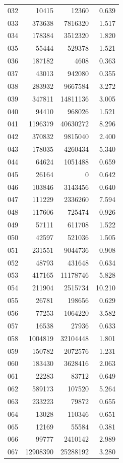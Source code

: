 \documentclass[anonymous,notoc]{gmcm2026}
\begin{document}
\begin{longtable}{lrrr}
032 & 10415 & 12360 & 0.639 \\
033 & 373638 & 7816320 & 1.517 \\
034 & 178384 & 3512320 & 1.820 \\
035 & 55444 & 529378 & 1.521 \\
036 & 187182 & 4608 & 0.363 \\
037 & 43013 & 942080 & 0.355 \\
038 & 283932 & 9667584 & 3.272 \\
039 & 347811 & 14811136 & 3.005 \\
040 & 94410 & 968026 & 1.521 \\
041 & 1196379 & 40630272 & 8.296 \\
042 & 370832 & 9815040 & 2.400 \\
043 & 178035 & 4260434 & 5.340 \\
044 & 64624 & 1051488 & 0.659 \\
045 & 26164 & 0 & 0.642 \\
046 & 103846 & 3143456 & 0.640 \\
047 & 111229 & 2336260 & 7.594 \\
048 & 117606 & 725474 & 0.926 \\
049 & 57111 & 611708 & 1.522 \\
050 & 42597 & 521036 & 1.505 \\
051 & 231551 & 9044736 & 0.908 \\
052 & 48793 & 431648 & 0.634 \\
053 & 417165 & 11178746 & 5.828 \\
054 & 211904 & 2515734 & 10.210 \\
055 & 26781 & 198656 & 0.629 \\
056 & 77253 & 1064220 & 3.582 \\
057 & 16538 & 27936 & 0.633 \\
058 & 1004819 & 32104448 & 1.801 \\
059 & 150782 & 2072576 & 1.231 \\
060 & 183430 & 3628416 & 2.063 \\
061 & 22283 & 83712 & 0.649 \\
062 & 589173 & 107520 & 5.264 \\
063 & 233223 & 79872 & 0.655 \\
064 & 13028 & 110346 & 0.651 \\
065 & 12169 & 55584 & 0.381 \\
066 & 99777 & 2410142 & 2.989 \\
067 & 12908390 & 25288192 & 3.280 \\

\end{longtable}
\end{document}
